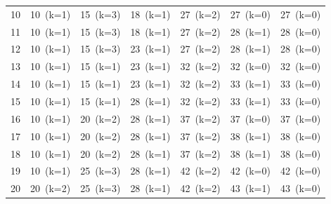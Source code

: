 \documentclass[12pt]{article}
\begin{document}
\begin{landscape}
\begin{longtable}{ccccccc}
10 & \cellcolor{green!40}10~(k=1) & \cellcolor{green!40}15~(k=3) & \cellcolor{green!40}18~(k=1) & \cellcolor{green!40}27~(k=2) & \cellcolor{red!20}27~(k=0) & \cellcolor{red!20}27~(k=0) \\
11 & \cellcolor{green!40}10~(k=1) & \cellcolor{green!40}15~(k=3) & \cellcolor{green!40}18~(k=1) & \cellcolor{green!40}27~(k=2) & \cellcolor{green!40}28~(k=1) & \cellcolor{red!20}28~(k=0) \\
12 & \cellcolor{green!40}10~(k=1) & \cellcolor{green!40}15~(k=3) & \cellcolor{green!40}23~(k=1) & \cellcolor{green!40}27~(k=2) & \cellcolor{green!40}28~(k=1) & \cellcolor{red!20}28~(k=0) \\
13 & \cellcolor{green!40}10~(k=1) & \cellcolor{yellow!50}15~(k=1) & \cellcolor{green!40}23~(k=1) & \cellcolor{green!40}32~(k=2) & \cellcolor{red!20}32~(k=0) & \cellcolor{red!20}32~(k=0) \\
14 & \cellcolor{green!40}10~(k=1) & \cellcolor{yellow!50}15~(k=1) & \cellcolor{green!40}23~(k=1) & \cellcolor{green!40}32~(k=2) & \cellcolor{green!40}33~(k=1) & \cellcolor{red!20}33~(k=0) \\
15 & \cellcolor{green!40}10~(k=1) & \cellcolor{yellow!50}15~(k=1) & \cellcolor{green!40}28~(k=1) & \cellcolor{green!40}32~(k=2) & \cellcolor{green!40}33~(k=1) & \cellcolor{red!20}33~(k=0) \\
16 & \cellcolor{green!40}10~(k=1) & \cellcolor{green!40}20~(k=2) & \cellcolor{green!40}28~(k=1) & \cellcolor{green!40}37~(k=2) & \cellcolor{red!20}37~(k=0) & \cellcolor{red!20}37~(k=0) \\
17 & \cellcolor{green!40}10~(k=1) & \cellcolor{green!40}20~(k=2) & \cellcolor{green!40}28~(k=1) & \cellcolor{green!40}37~(k=2) & \cellcolor{green!40}38~(k=1) & \cellcolor{red!20}38~(k=0) \\
18 & \cellcolor{green!40}10~(k=1) & \cellcolor{green!40}20~(k=2) & \cellcolor{green!40}28~(k=1) & \cellcolor{green!40}37~(k=2) & \cellcolor{green!40}38~(k=1) & \cellcolor{red!20}38~(k=0) \\
19 & \cellcolor{green!40}10~(k=1) & \cellcolor{green!40}25~(k=3) & \cellcolor{green!40}28~(k=1) & \cellcolor{green!40}42~(k=2) & \cellcolor{red!20}42~(k=0) & \cellcolor{red!20}42~(k=0) \\
20 & \cellcolor{green!40}20~(k=2) & \cellcolor{green!40}25~(k=3) & \cellcolor{green!40}28~(k=1) & \cellcolor{green!40}42~(k=2) & \cellcolor{green!40}43~(k=1) & \cellcolor{red!20}43~(k=0) \\
\bottomrule
\end{longtable}
\end{landscape}
\end{document}
